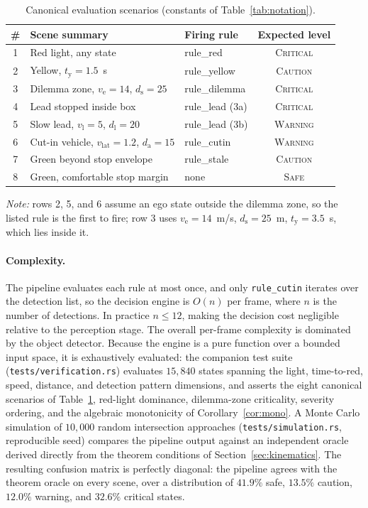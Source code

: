 \documentclass[conference, a4paper]{IEEEtran}
\theoremstyle{plain}
\newcommand{\ds}{d_{\mathrm{s}}}
\newcommand{\da}{d_{\mathrm{a}}}
\newcommand{\dl}{d_{\mathrm{l}}}
\newcommand{\tred}{t_{\mathrm{y}}}
\newcommand{\ve}{v_{\mathrm{e}}}
\newcommand{\vl}{v_{\mathrm{l}}}
\newcommand{\vlat}{v_{\mathrm{lat}}}
\begin{document}
\begin{table}[t]
\caption{Canonical evaluation scenarios (constants of
Table~\ref{tab:notation}).}
\label{tab:scenarios}
\centering
\footnotesize
\begin{tabular}{@{}cllc@{}}
\toprule
\# & Scene summary & Firing rule & Expected level \\
\midrule
1 & Red light, any state & rule\_red & \textsc{Critical} \\
2 & Yellow, $\tred=1.5$~s & rule\_yellow & \textsc{Caution} \\
3 & Dilemma zone, $\ve{=}14$, $\ds{=}25$ & rule\_dilemma & \textsc{Critical} \\
4 & Lead stopped inside box & rule\_lead (3a) & \textsc{Critical} \\
5 & Slow lead, $\vl{=}5$, $\dl{=}20$ & rule\_lead (3b) & \textsc{Warning} \\
6 & Cut-in vehicle, $\vlat{=}1.2$, $\da{=}15$ & rule\_cutin & \textsc{Warning} \\
7 & Green beyond stop envelope & rule\_stale & \textsc{Caution} \\
8 & Green, comfortable stop margin & none & \textsc{Safe} \\
\bottomrule
\end{tabular}
\end{table}

\emph{Note:} rows 2, 5, and 6 assume an ego state outside the dilemma zone,
so the listed rule is the first to fire; row 3 uses $\ve = 14$~m/s,
$\ds = 25$~m, $\tred = 3.5$~s, which lies inside it.

\paragraph{Complexity.} The pipeline evaluates each rule at most once, and
only \texttt{rule\_cutin} iterates over the detection list, so the decision
engine is $O(n)$ per frame, where $n$ is the number of detections. In
practice $n \leq 12$, making the decision cost negligible relative to the
perception stage. The overall per-frame complexity is dominated by the
object detector. Because the engine is a pure function over a bounded input
space, it is exhaustively evaluated: the companion test suite
(\texttt{tests/verification.rs}) evaluates $15{,}840$ states spanning the
light, time-to-red, speed, distance, and detection pattern dimensions, and
asserts the eight canonical scenarios of Table~\ref{tab:scenarios}, red-light
dominance, dilemma-zone criticality, severity ordering, and the algebraic
monotonicity of Corollary~\ref{cor:mono}. A Monte Carlo simulation of
$10{,}000$ random intersection approaches (\texttt{tests/simulation.rs},
reproducible seed) compares the pipeline output against an independent oracle
derived directly from the theorem conditions of Section~\ref{sec:kinematics}.
The resulting confusion matrix is perfectly diagonal: the pipeline agrees
with the theorem oracle on every scene, over a distribution of $41.9\%$ safe,
$13.5\%$ caution, $12.0\%$ warning, and $32.6\%$ critical states.
\end{document}
